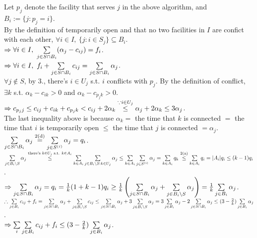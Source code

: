 \begin{pr}
Let $p_j$ denote the facility that serves $j$ in the above algorithm, and $B_i:=\{j:p_j=i\}$.\\
By the definition of temporarily open and that no two facilities in $I$ are confict with each other, $\forall i\in I,\ \{j:i\in S_j\}\subseteq B_i$.\\
$\Rightarrow\forall i\in I,\ \sum\limits_{j\in S\cap B_i}(\alpha_j-c_{ij})=f_i$.\\
$\Rightarrow\forall i\in I,\ f_i+\sum\limits_{j\in S\cap B_i}c_{ij}=\sum\limits_{j\in S\cap B_i}\alpha_j$.\\
$\forall j\notin S$, by 3., there's $i\in U_j$ s.t. $i$ conflicts with $p_j$. By the definition of conflict, $\exists k$ s.t. $\alpha_k-c_{ik}>0$ and $\alpha_k-c_{p_jk}>0$.\\
$\Rightarrow c_{p_jj}\leq c_{ij}+c_{ik}+c_{p_jk}<c_{ij}+2\alpha_k\overset{\because i\in U_j}\leq\alpha_j+2\alpha_k\leq3\alpha_j$.\\
The last inequality above is because $\alpha_k=$ the time that $k$ is connected $=$ the time that $i$ is temporarily open $\leq$ the time that $j$ is connected $=\alpha_j$.\\
$\sum\limits_{j\in S\cap B_i}\alpha_j\overset{\text{2(d)}}=\sum\limits_{j\in S^{(i)}}\alpha_j=q_i$.\\
$\sum\limits_{j\in B_i\setminus S}\alpha_j\overset{\text{there's }k\in U_j\text{ s.t. }k\in A_i}\leq\sum\limits_{k\in A_i}\sum\limits_{j\in B_i\setminus S:k\in U_j}\alpha_j\leq\sum\limits_{k\in A_i}\sum\limits_{j\in S^{(i)}}\alpha_j=\sum\limits_{k\in A_i}q_k\overset{\text{2(a)}}\leq\sum\limits_{k\in A_i}q_i=|A_i|q_i\leq(k-1)q_i$.\\
$\Rightarrow\sum\limits_{j\in S\cap B_i}\alpha_j=q_i=\frac1k(1+k-1)q_i\geq\frac1k\left(\sum\limits_{j\in S\cap B_i}\alpha_j+\sum\limits_{j\in B_i\setminus S}\alpha_j\right)=\frac1k\sum\limits_{j\in B_i}\alpha_j$.\\
$\therefore\sum\limits_{j\in B_i}c_{ij}+f_i=\sum\limits_{j\in S\cap B_i}\alpha_j+\sum\limits_{j\in B_i\setminus S}c_{ij}\leq\sum\limits_{j\in S\cap B_i}\alpha_j+3\sum\limits_{j\in B_i\setminus S}\alpha_j=3\sum\limits_{j\in B_i}\alpha_j-2\sum\limits_{j\in S\cap B_i}\alpha_j\leq(3-\frac2k)\sum\limits_{j\in B_i}\alpha_j$.\\
$\Rightarrow\sum\limits_i\sum\limits_{j\in B_i}c_{ij}+f_i\leq(3-\frac2k)\sum\limits_{j\in B_i}\alpha_j$.
\end{pr}
